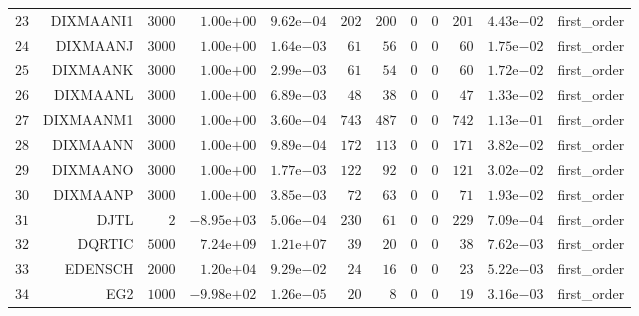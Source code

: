 \begin{longtable}{rrrrrrrrrrrr}
  \(    23\) & DIXMAANI1 & \(  3000\) & \( 1.00\)e\(+00\) & \( 9.62\)e\(-04\) & \(   202\) & \(   200\) & \(     0\) & \(     0\) & \(   201\) & \( 4.43\)e\(-02\) & first\_order \\
  \(    24\) & DIXMAANJ & \(  3000\) & \( 1.00\)e\(+00\) & \( 1.64\)e\(-03\) & \(    61\) & \(    56\) & \(     0\) & \(     0\) & \(    60\) & \( 1.75\)e\(-02\) & first\_order \\
  \(    25\) & DIXMAANK & \(  3000\) & \( 1.00\)e\(+00\) & \( 2.99\)e\(-03\) & \(    61\) & \(    54\) & \(     0\) & \(     0\) & \(    60\) & \( 1.72\)e\(-02\) & first\_order \\
  \(    26\) & DIXMAANL & \(  3000\) & \( 1.00\)e\(+00\) & \( 6.89\)e\(-03\) & \(    48\) & \(    38\) & \(     0\) & \(     0\) & \(    47\) & \( 1.33\)e\(-02\) & first\_order \\
  \(    27\) & DIXMAANM1 & \(  3000\) & \( 1.00\)e\(+00\) & \( 3.60\)e\(-04\) & \(   743\) & \(   487\) & \(     0\) & \(     0\) & \(   742\) & \( 1.13\)e\(-01\) & first\_order \\
  \(    28\) & DIXMAANN & \(  3000\) & \( 1.00\)e\(+00\) & \( 9.89\)e\(-04\) & \(   172\) & \(   113\) & \(     0\) & \(     0\) & \(   171\) & \( 3.82\)e\(-02\) & first\_order \\
  \(    29\) & DIXMAANO & \(  3000\) & \( 1.00\)e\(+00\) & \( 1.77\)e\(-03\) & \(   122\) & \(    92\) & \(     0\) & \(     0\) & \(   121\) & \( 3.02\)e\(-02\) & first\_order \\
  \(    30\) & DIXMAANP & \(  3000\) & \( 1.00\)e\(+00\) & \( 3.85\)e\(-03\) & \(    72\) & \(    63\) & \(     0\) & \(     0\) & \(    71\) & \( 1.93\)e\(-02\) & first\_order \\
  \(    31\) & DJTL & \(     2\) & \(-8.95\)e\(+03\) & \( 5.06\)e\(-04\) & \(   230\) & \(    61\) & \(     0\) & \(     0\) & \(   229\) & \( 7.09\)e\(-04\) & first\_order \\
  \(    32\) & DQRTIC & \(  5000\) & \( 7.24\)e\(+09\) & \( 1.21\)e\(+07\) & \(    39\) & \(    20\) & \(     0\) & \(     0\) & \(    38\) & \( 7.62\)e\(-03\) & first\_order \\
  \(    33\) & EDENSCH & \(  2000\) & \( 1.20\)e\(+04\) & \( 9.29\)e\(-02\) & \(    24\) & \(    16\) & \(     0\) & \(     0\) & \(    23\) & \( 5.22\)e\(-03\) & first\_order \\
  \(    34\) & EG2 & \(  1000\) & \(-9.98\)e\(+02\) & \( 1.26\)e\(-05\) & \(    20\) & \(     8\) & \(     0\) & \(     0\) & \(    19\) & \( 3.16\)e\(-03\) & first\_order \\

\end{longtable}
